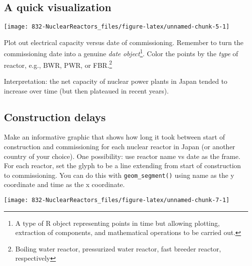 \documentclass[]{tufte-handout}
\begin{document}
\subsection{A quick visualization}\label{a-quick-visualization}

\enlargethispage{1in}

\begin{marginfigure}
\texttt{[image: 832-NuclearReactors\_files/figure-latex/unnamed-chunk-5-1]} \end{marginfigure}

Plot out electrical capacity versus date of commissioning. Remember to
turn the commissioning date into a genuine \emph{date object}\footnote{A
  type of R object representing points in time but allowing plotting,
  extraction of components, and mathematical operations to be carried
  out.}. Color the points by the \emph{type} of reactor, e.g., BWR, PWR,
or FBR.\footnote{Boiling water reactor, pressurized water reactor, fast
  breeder reactor, respectively}

Interpretation: the net capacity of nuclear power plants in Japan tended
to increase over time (but then plateaued in recent years).

\subsection{Construction delays}\label{construction-delays}

Make an informative graphic that shows how long it took between start of
construction and commissioning for each nuclear reactor in Japan (or
another country of your choice). One possibility: use reactor name vs
date as the frame. For each reactor, set the glyph to be a line
extending from start of construction to commissioning. You can do this
with \texttt{geom\_segment()} using name as the y coordinate and time as
the x coordinate.

\begin{marginfigure}
\texttt{[image: 832-NuclearReactors\_files/figure-latex/unnamed-chunk-7-1]} \end{marginfigure}
\end{document}
